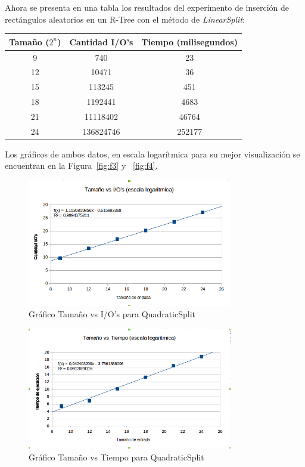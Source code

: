 \documentclass[letterpaper,12pt]{article}
\begin{document}
Ahora se presenta en una tabla los resultados del experimento de inserci\'on de rect\'angulos aleatorios en un R-Tree con el m\'etodo de \textit{LinearSplit}: \\
\begin{tabular}{|c|c|c|}
\hline
\textbf{Tama\~no ($2^n$)} & \textbf{Cantidad I/O's} & \textbf{Tiempo (milisegundos)} \\
\hline
9 & 740 & 23 \\
\hline
12 & 10471 & 36 \\
\hline
15 & 113245 & 451 \\
\hline
18 & 1192441 & 4683 \\
\hline
21 & 11118402 & 46764 \\
\hline
24 & 136824746 & 252177 \\
\hline
\end{tabular}

Los gr\'aficos de ambos datos, en escala logar\'itmica para su mejor visualizaci\'on se encuentran en la Figura~\ref{fig:f3} y ~\ref{fig:f4}.

\begin{figure}
  \centering
    \includegraphics[width=0.8\textwidth]{quadratic_io}
  \caption{Gr\'afico Tama\~no vs I/O's para QuadraticSplit}
  \label{fig:f1}
\end{figure}

\begin{figure}
  \centering
    \includegraphics[width=0.8\textwidth]{quadratic_tiempo}
  \caption{Gr\'afico Tama\~no vs Tiempo para QuadraticSplit}
  \label{fig:f2}
\end{figure}
\end{document}
